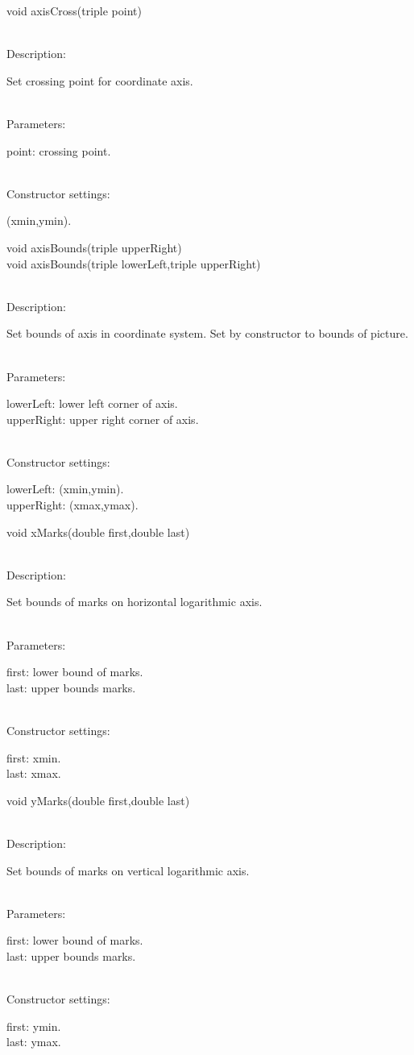 \documentclass[12pt,a4paper]{article}
\newcommand{\memberitem}[1]{
                              \vspace{-0.5pc}
                              \end{minipage}\\
                              \phantom{M}#1:\\
                              \phantom{MM}
                              \begin{minipage}[t]{12cm}

                           }
\newcommand{\memdsc}{\memberitem{Description}}
\newcommand{\meminp}{\memberitem{Parameters}}
\newcommand{\memdef}{\memberitem{Constructor settings}}
\newenvironment{MemberDescr}
  {
    \begin{minipage}{15cm}
    \bf
  }
  {
    \end{minipage}
  }
\begin{document}
  \begin{MemberDescr}
    void axisCross(triple point)\\
    \memdsc
      Set crossing point for coordinate axis.\\
    \meminp
      point: crossing point.\\
    \memdef
      (xmin,ymin).\\
  \end{MemberDescr}

  \begin{MemberDescr}
    void axisBounds(triple upperRight)\\
    void axisBounds(triple lowerLeft,triple upperRight)\\
    \memdsc
      Set bounds of axis in coordinate system. Set by constructor to bounds
      of picture.\\
    \meminp
      lowerLeft:  lower left corner of axis.\\
      upperRight: upper right corner of axis.\\
    \memdef
      lowerLeft: (xmin,ymin).\\
      upperRight: (xmax,ymax).\\
  \end{MemberDescr}

  \begin{MemberDescr}
    void xMarks(double first,double last)\\
    \memdsc
      Set bounds of marks on horizontal logarithmic axis.\\
    \meminp
      first: lower bound of marks.\\
      last: upper bounds marks.\\
    \memdef
      first: xmin.\\
      last: xmax.\\
  \end{MemberDescr}

  \begin{MemberDescr}
    void yMarks(double first,double last)\\
    \memdsc
      Set bounds of marks on vertical logarithmic axis.\\
    \meminp
      first: lower bound of marks.\\
      last: upper bounds marks.\\
    \memdef
      first: ymin.\\
      last: ymax.\\
  \end{MemberDescr}
\end{document}
